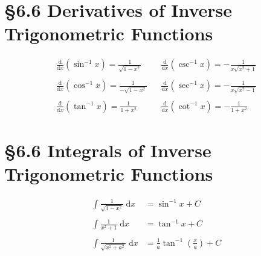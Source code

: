 \newcommand{\dox}{\frac{\mathrm{d}}{\mathrm{d}x}}
\newcommand{\doxP}[1]{\dox\left({#1}\right)}
\newcommand{\lnp}[1]{\ln\left({#1}\right)}
\newcommand{\eqWithMsg}[1]{\overset{{#1}}{=\joinrel=}}
\newcommand{\longEqWithMsg}[1]{\xlongequal{\!{#1}\!}}
\newcommand{\tabspace}{\;\;\;} %
\newcommand{\xtabspace}{\tabspace\tabspace\tabspace\tabspace} %
\DeclareRobustCommand\iff{\;\Longleftrightarrow\;}


\section*{\S{6.6} Derivatives of Inverse Trigonometric Functions}
\begin{equation}
\begin{split}
    \doxP{\sin^{-1} x} = \frac{1}{\sqrt{1 - x^2}} \tabspace& \doxP{\csc^{-1} x} = -\frac{1}{x\sqrt{x^2 + 1}} \\\\
    \doxP{\cos^{-1} x} = \frac{1}{-\sqrt{1 - x^2}} \tabspace& \doxP{\sec^{-1} x} = -\frac{1}{x\sqrt{x^2 - 1}} \\\\
    \doxP{\tan^{-1} x} = \frac{1}{1 + x^2} \tabspace& \doxP{\cot^{-1} x} = -\frac{1}{1 + x^2}
\end{split}
\end{equation}

\section*{\S{6.6} Integrals of Inverse Trigonometric Functions}
\begin{equation}
\begin{split}
    \int \frac{1}{\sqrt{1 - x^2}} \;\mathrm{d}x &= \sin^{-1} x + C \\\\
    \int \frac{1}{x^2 + 1} \;\mathrm{d}x &= \tan^{-1} x + C \\\\
    \int \frac{1}{\sqrt{x^2 + a^2}} \;\mathrm{d}x &= \frac{1}{a}\tan^{-1}\left(\frac{x}{a}\right) + C
\end{split}
\end{equation}

